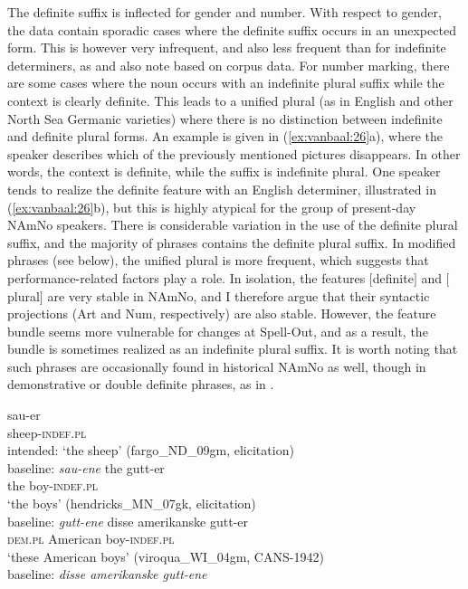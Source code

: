\documentclass[output=paper]{langscibook}
\begin{document}
The definite suffix is inflected for gender and number. With respect to gender, the data contain sporadic cases where the definite suffix occurs in an unexpected form. This is however very infrequent, and also less frequent than for indefinite determiners, as \citet{JohannessenLarsson2015} and \citet{LohndalWestergaard2016} also note based on corpus data. For number marking, there are some cases where the noun occurs with an indefinite plural suffix while the context is clearly definite. This leads to a unified plural (as in English and other North Sea Germanic varieties) where there is no distinction between indefinite and definite plural forms. An example is given in (\ref{ex:vanbaal:26}a), where the speaker describes which of the previously mentioned pictures disappears. In other words, the context is definite, while the suffix is indefinite plural. One speaker tends to realize the definite feature with an English determiner, illustrated in (\ref{ex:vanbaal:26}b), but this is highly atypical for the group of present-day NAmNo speakers. There is considerable variation in the use of the definite plural suffix, and the majority of phrases contains the definite plural suffix. In modified phrases (see  below), the unified plural is more frequent, which suggests that performance-related factors play a role. In isolation, the features $[$definite$]$ and $[$plural$]$ are very stable in NAmNo, and I therefore argue that their syntactic projections (Art and Num, respectively) are also stable. However, the feature bundle seems more vulnerable for changes at Spell-Out, and as a result, the bundle is sometimes realized as an indefinite plural suffix. It is worth noting that such phrases are occasionally found in historical NAmNo as well, though in demonstrative or double definite phrases, as in . 
 

\ea \label{ex:vanbaal:26}
\ea\label{ex:vanbaal:26a}
\gll sau-er \\
    sheep-\textsc{indef.pl} \\
\glt intended: `the sheep' (fargo\_ND\_09gm, elicitation) \\
baseline: \textit{sau-ene} 
\ex \label{ex:vanbaal:26b}
\gll the gutt-er \\
    the boy-\textsc{indef.pl} \\
\glt `the boys' (hendricks\_MN\_07gk, elicitation) \\
baseline: \textit{gutt-ene}
\z
\ex \label{ex:vanbaal:27}
\gll disse amerikanske gutt-er \\
    \textsc{dem.pl} American boy-\textsc{indef.pl} \\
\glt `these American boys' (viroqua\_WI\_04gm, CANS-1942) \\
baseline: \textit{disse amerikanske gutt-ene}
\z 
\end{document}
